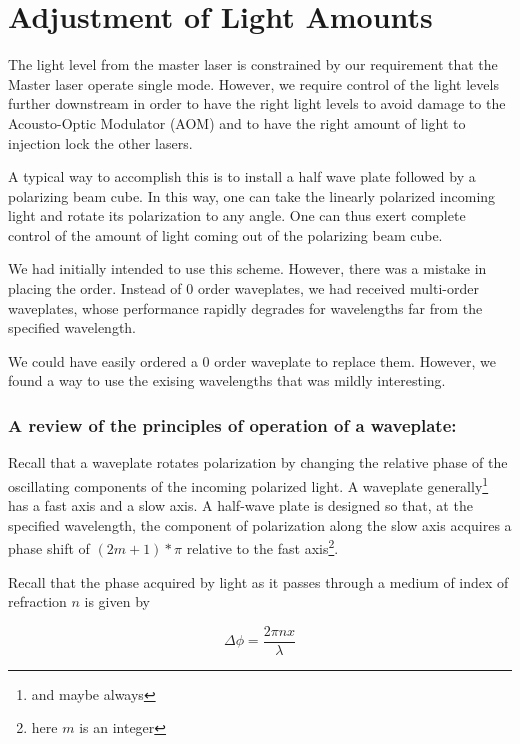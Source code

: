
\chapter{Adjustment of Light Amounts}
\label{twoWaveplateTrick}

The light level from the master laser is constrained by our requirement that the Master laser operate single mode. However, we require control of the light levels further downstream in order to have the right light levels to avoid damage to the Acousto-Optic Modulator (AOM) and to have the right amount of light to injection lock the other lasers. 

A typical way to accomplish this is to install a half wave plate followed by a polarizing beam cube. In this way, one can take the linearly polarized incoming light and rotate its polarization to any angle. One can thus exert complete control of the amount of light coming out of the polarizing beam cube. 

We had initially intended to use this scheme. However, there was a mistake in placing the order. Instead of 0 order waveplates, we had received multi-order waveplates, whose performance rapidly degrades for wavelengths far from the specified wavelength. 

We could have easily ordered a 0 order waveplate to replace them. However, we found a way to use the exising wavelengths that was mildly interesting.

\subsection{A review of the principles of operation of a waveplate: }

Recall that a waveplate rotates polarization by changing the relative phase of the oscillating components of the incoming polarized light. A waveplate generally\footnote{and maybe always} has a fast axis and a slow axis. A half-wave plate is designed so that, at the specified wavelength, the component of polarization along the slow axis acquires a phase shift of $(2m+1)*\pi$ relative to the fast axis\footnote{here $m$ is an integer}. 

Recall that the phase acquired by light as it passes through a medium of index of refraction $n$ is given by 

\begin{equation}
  \Delta \phi = \frac{2 \pi n x}{\lambda} \label{deltaPhi0}
\end{equation}

